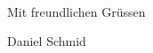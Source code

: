 \documentclass[a4paper,12pt]{letter}
\begin{document}
    \thispagestyle{fancy}
    \renewcommand{\headrulewidth}{0pt}
    \parbox[t][20mm]{89mm}{\fromName \\ \fromStreet \\ \fromPlace \\\\ \fromTel }
    \parbox[b][15mm]{90mm}{\fromDate}
    \\\par\vspace{10mm}\hspace{90mm}\parbox[b][15mm]{55mm} {\toAdress }

    \par
    \textbf{} \\

    \salutContact \\\\
    \vspace{10mm}
    \par\hspace{90mm}Mit freundlichen Grüssen
    \par\vspace{15mm}\hspace{90mm}Daniel Schmid
\end{document}
